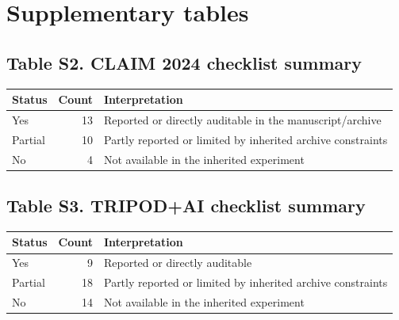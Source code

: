 \documentclass[a4paper,11pt]{article}
\begin{document}
\section*{Supplementary tables}

\subsection*{Table S2. CLAIM 2024 checklist summary}
\begin{center}
\begin{tabular}{lrl}
\toprule
Status & Count & Interpretation \\
\midrule
Yes & 13 & Reported or directly auditable in the manuscript/archive \\
Partial & 10 & Partly reported or limited by inherited archive constraints \\
No & 4 & Not available in the inherited experiment \\
\bottomrule
\end{tabular}
\end{center}

\subsection*{Table S3. TRIPOD+AI checklist summary}
\begin{center}
\begin{tabular}{lrl}
\toprule
Status & Count & Interpretation \\
\midrule
Yes & 9 & Reported or directly auditable \\
Partial & 18 & Partly reported or limited by inherited archive constraints \\
No & 14 & Not available in the inherited experiment \\
\bottomrule
\end{tabular}
\end{center}
\end{document}

